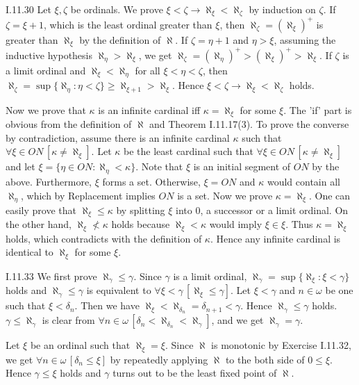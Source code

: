 \documentclass[12pt]{article}
\begin{document}
\begin{customthm}{I.11.30}
  Let $\xi,\zeta$ be ordinals. We prove $\xi<\zeta\rightarrow\aleph_\xi<\aleph_\zeta$ by induction on $\zeta$. If $\zeta=\xi+1$, which is the least ordinal greater than $\xi$, then $\aleph_\zeta=(\aleph_\xi)^+$ is greater than $\aleph_\xi$ by the definition of $\aleph$. If $\zeta=\eta+1$ and $\eta>\xi$, assuming the inductive hypothesis $\aleph_\eta>\aleph_\xi$, we get $\aleph_\zeta=(\aleph_\eta)^+>(\aleph_\xi)^+>\aleph_\xi$. If $\zeta$ is a limit ordinal and $\aleph_\xi<\aleph_\eta$ for all $\xi<\eta<\zeta$, then $\aleph_\zeta=\sup\{\aleph_\eta:\eta<\zeta\}\geq\aleph_{\xi+1}>\aleph_\xi$. Hence $\xi<\zeta\rightarrow\aleph_\xi<\aleph_\zeta$ holds.

  Now we prove that $\kappa$ is an infinite cardinal iff $\kappa=\aleph_\xi$ for some $\xi$. The 'if' part is obvious from the definition of $\aleph$ and Theorem I.11.17(3). To prove the converse by contradiction, assume there is an infinite cardinal $\kappa$ such that $\forall\xi\in ON\,[\kappa\neq\aleph_\xi]$. Let $\kappa$ be the least cardinal such that $\forall\xi\in ON\,[\kappa\neq\aleph_\xi]$ and let $\xi=\{\eta\in ON:\aleph_\eta<\kappa\}$. Note that $\xi$ is an initial segment of $ON$ by the above. Furthermore, $\xi$ forms a set. Otherwise, $\xi=ON$ and $\kappa$ would contain all $\aleph_\eta$, which by Replacement implies $ON$ is a set. Now we prove $\kappa=\aleph_\xi$. One can easily prove that $\aleph_\xi\leq\kappa$ by splitting $\xi$ into $0$, a successor or a limit ordinal. On the other hand, $\aleph_\xi\not<\kappa$ holds because $\aleph_\xi<\kappa$ would imply $\xi\in\xi$. Thus $\kappa=\aleph_\xi$ holds, which contradicts with the definition of $\kappa$. Hence any infinite cardinal is identical to $\aleph_\xi$ for some $\xi$.
\end{customthm}

\begin{customthm}{I.11.33}
  We first prove $\aleph_\gamma\leq\gamma$. Since $\gamma$ is a limit ordinal, $\aleph_\gamma=\sup\{\aleph_\xi:\xi<\gamma\}$ holds and $\aleph_\gamma\leq\gamma$ is equivalent to $\forall\xi<\gamma\,[\aleph_\xi\leq\gamma]$. Let $\xi<\gamma$ and $n\in\omega$ be one such that $\xi<\delta_n$. Then we have $\aleph_\xi<\aleph_{\delta_n}=\delta_{n+1}<\gamma$. Hence $\aleph_\gamma\leq\gamma$ holds. $\gamma\leq\aleph_\gamma$ is clear from $\forall n\in\omega\,[\delta_n<\aleph_{\delta_n}<\aleph_\gamma]$, and we get $\aleph_\gamma=\gamma$.

  Let $\xi$ be an ordinal such that $\aleph_\xi=\xi$. Since $\aleph$ is monotonic by Exercise I.11.32, we get $\forall n\in\omega\,[\delta_n\leq\xi]$ by repeatedly applying $\aleph$ to the both side of $0\leq\xi$.  Hence $\gamma\leq\xi$ holds and $\gamma$ turns out to be the least fixed point of $\aleph$.
\end{customthm}
\end{document}
